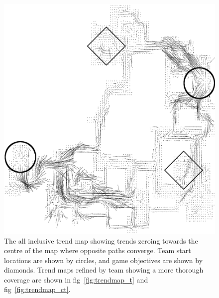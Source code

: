 \documentclass[journal]{IEEEtran}
\begin{document}
\begin{figure}
    \centering
    \includegraphics[width=\textwidth,height=1.084\textwidth]{TrendMapBoth.png}
    \caption{The all inclusive trend map showing trends zeroing towards the centre of the map where opposite paths converge. Team start locations are shown by circles, and game objectives are shown by diamonds. Trend maps refined by team showing a more thorough coverage are shown in fig~\ref{fig:trendmap_t} and fig~\ref{fig:trendmap_ct}.}
    \label{fig:trendmapboth}
\end{figure}
\end{document}
